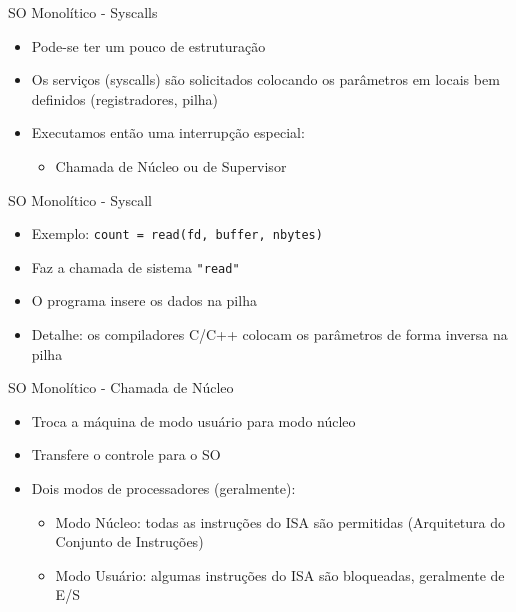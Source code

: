 \documentclass{beamer}
\begin{document}
\begin{frame}{SO Monolítico - Syscalls}
    \begin{itemize}
        \item Pode-se ter um pouco de estruturação
        \item Os serviços (syscalls) são solicitados colocando os parâmetros em locais bem definidos (registradores, pilha)
        \item Executamos então uma interrupção especial:
              \begin{itemize}
                  \item Chamada de Núcleo ou de Supervisor
              \end{itemize}
    \end{itemize}
\end{frame}
\begin{frame}{SO Monolítico - Syscall}
    \begin{itemize}
        \item Exemplo: \texttt{count = read(fd, buffer, nbytes)}
        \item Faz a chamada de sistema \texttt{"read"}
        \item O programa insere os dados na pilha
        \item Detalhe: os compiladores C/C++ colocam os parâmetros de forma inversa na pilha
    \end{itemize}
\end{frame}
\begin{frame}{SO Monolítico - Chamada de Núcleo}
    \begin{itemize}
        \item Troca a máquina de modo usuário para modo núcleo
        \item Transfere o controle para o SO
        \item Dois modos de processadores (geralmente):
              \begin{itemize}
                  \item Modo Núcleo: todas as instruções do ISA são permitidas (Arquitetura do Conjunto de Instruções)
                  \item Modo Usuário: algumas instruções do ISA são bloqueadas, geralmente de E/S
              \end{itemize}
    \end{itemize}
\end{frame}
\end{document}
